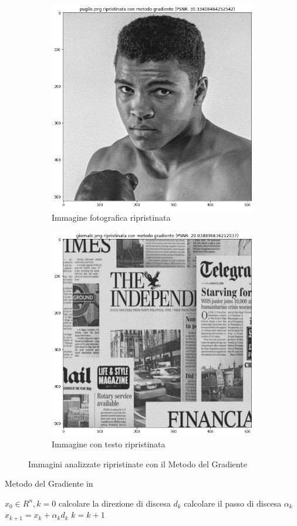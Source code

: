 \begin{figure}[H]
    \begin{subfigure}{0.5\textwidth}
        \centering
        \includegraphics[width=0.6\linewidth]{imgRel/fotogrmg.png}
        \caption{Immagine fotografica ripristinata}
        \label{fig: pugilemg1}
    \end{subfigure}%
    \begin{subfigure}{0.5\textwidth}\centering
        \includegraphics[width=0.6\linewidth]{imgRel/giornalemg.png}
        \caption{Immagine con testo ripristinata}
    \end{subfigure}
\caption{Immagini analizzate ripristinate con il Metodo del Gradiente}
\end{figure}
 
\begin{algorithm}[H]
	\caption{Metodo del Gradiente in }\label{alg:mg}
	\begin{algorithmic}[1]
		\State $x_0 \in R^n, k=0$
            \State calcolare la direzione di discesa $d_k$
            \State calcolare il passo di discesa $\alpha_k$
            \State $x_{k+1} = x_k+\alpha_kd_k$
            \State $k = k+1$
        \EndWhile
	\end{algorithmic}
\end{algorithm}

